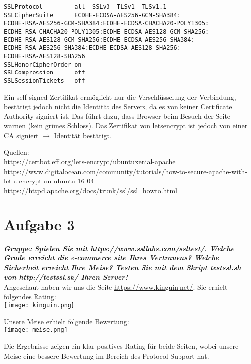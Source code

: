 \documentclass[12pt, a4paper]{report}
\begin{document}
\begin{enumerate}
	\begin{verbatim}
SSLProtocol         all -SSLv3 -TLSv1 -TLSv1.1
SSLCipherSuite      ECDHE-ECDSA-AES256-GCM-SHA384:
ECDHE-RSA-AES256-GCM-SHA384:ECDHE-ECDSA-CHACHA20-POLY1305:
ECDHE-RSA-CHACHA20-POLY1305:ECDHE-ECDSA-AES128-GCM-SHA256:
ECDHE-RSA-AES128-GCM-SHA256:ECDHE-ECDSA-AES256-SHA384:
ECDHE-RSA-AES256-SHA384:ECDHE-ECDSA-AES128-SHA256:
ECDHE-RSA-AES128-SHA256
SSLHonorCipherOrder on
SSLCompression      off
SSLSessionTickets   off
	\end{verbatim}
Ein self-signed Zertifikat ermöglicht nur die Verschlüsselung der Verbindung, bestätigt jedoch nicht die Identität des Servers, da es von keiner Certificate Authority signiert ist. Das führt dazu, dass Browser beim Besuch der Seite warnen (kein grünes Schloss). Das Zertifikat von letsencrypt ist jedoch von einer CA signiert $\rightarrow$ Identität bestätigt.
\end{enumerate}
Quellen:\\
https://certbot.eff.org/lets-encrypt/ubuntuxenial-apache\\
https://www.digitalocean.com/community/tutorials/how-to-secure-apache-with-let-s-encrypt-on-ubuntu-16-04\\
https://httpd.apache.org/docs/trunk/ssl/ssl\_howto.html


\section*{Aufgabe 3}
\textbf{\textit{Gruppe: Spielen Sie mit https://www.ssllabs.com/ssltest/. Welche Grade erreicht
die e-commerce site Ihres Vertrauens? Welche Sicherheit erreicht Ihre Meise? Testen Sie
mit dem Skript testssl.sh von http://testssl.sh/ Ihren Server!}}\\
Angeschaut haben wir uns die Seite \url{https://www.kinguin.net/}. Sie erhielt folgendes Rating:\\
\texttt{[image: kinguin.png]}

Unsere Meise erhielt folgende Bewertung:\\
\texttt{[image: meise.png]}

Die Ergebnisse zeigen ein klar positives Rating für beide Seiten, wobei unsere Meise eine bessere Bewertung im Bereich des Protocol Support hat.
\end{document}
